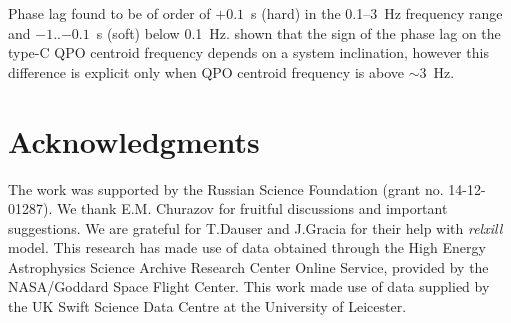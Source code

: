 \documentclass[a4paper,fleqn,usenatbib]{mnras}
\begin{document}
Phase lag found to be of order of $+0.1$~s (hard) in the 0.1--3~Hz frequency range and $-1$..$-0.1$~s (soft) below 0.1~Hz.
\citet{2017MNRAS.464.2643V} shown that the sign of the phase lag on the type-C QPO centroid frequency depends on a system inclination, however this difference is explicit only when QPO centroid frequency is above $\sim3$~Hz.


\section*{Acknowledgments}
The work was supported by the Russian Science Foundation (grant no. 14-12-01287). 
We thank E.M. Churazov for fruitful discussions and important suggestions. 
We are grateful for T.Dauser and J.Gracia for their help with {\em relxill} model. 
This research has made use of data obtained through the High Energy Astrophysics Science Archive Research Center Online Service, provided by the NASA/Goddard Space Flight Center.
This work made use of data supplied by the UK Swift Science Data Centre at the University of Leicester.



\bsp	
\label{lastpage}
\end{document}
